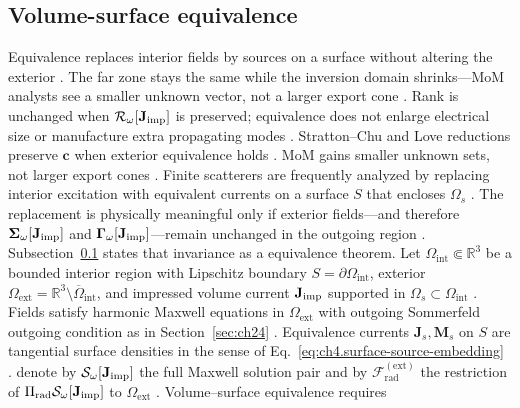 \subsection{Volume-surface equivalence}
\label{sec:ch421}
Equivalence replaces interior fields by sources on a surface without altering the exterior \cite{stratton1941}. The far zone stays the same while the inversion domain shrinks---MoM analysts see a smaller unknown vector, not a larger export cone \cite{harrington2001}. Rank is unchanged when $\mathcal{R}_\omega[\mathbf{J}_{\mathrm{imp}}]$ is preserved; equivalence does not enlarge electrical size or manufacture extra propagating modes \cite{maxwell1873}.
Stratton--Chu and Love reductions preserve $\mathbf{c}$ when exterior equivalence holds \cite{stratton1941}. MoM gains smaller unknown sets, not larger export cones \cite{devaney2004}.
\medskip
Finite scatterers are frequently analyzed by replacing interior excitation with equivalent currents on a
surface \(S\) that encloses \(\Omega_{s}\) \cite{stratton1941}. The replacement is physically
meaningful only if exterior fields---and therefore \(\boldsymbol{\Sigma}_\omega[\mathbf{J}_{\mathrm{imp}}]\) and
\(\boldsymbol{\Gamma}_\omega[\mathbf{J}_{\mathrm{imp}}]\)---remain unchanged in the outgoing region
\cite{collin2001}. Subsection~\ref{sec:ch421} states that invariance as a equivalence theorem.
Let \(\Omega_{\mathrm{int}}\Subset\mathbb{R}^{3}\) be a bounded interior region with Lipschitz boundary
\(S=\partial\Omega_{\mathrm{int}}\), exterior \(\Omega_{\mathrm{ext}}=\mathbb{R}^{3}\setminus\overline{\Omega}_{\mathrm{int}}\),
and impressed volume current \(\mathbf{J}_{\mathrm{imp}}\) supported in \(\Omega_{s}\subset\Omega_{\mathrm{int}}\)
\cite{stratton1941}. Fields satisfy harmonic Maxwell equations in \(\Omega_{\mathrm{ext}}\) with outgoing
Sommerfeld outgoing condition as in Section~\ref{sec:ch24} \cite{stratton1941}. Equivalence currents
\(\mathbf{J}_{s},\mathbf{M}_{s}\) on \(S\) are tangential surface densities in the sense of
Eq.~\eqref{eq:ch4.surface-source-embedding} \cite{stratton1941}.
denote by \(\mathcal{S}_\omega[\mathbf{J}_{\mathrm{imp}}]\) the full Maxwell solution pair and by
\(\mathcal{F}^{\mathrm{(ext)}}_{\mathrm{rad}}\) the restriction of \(\Pi_{\mathrm{rad}}\mathcal{S}_\omega[\mathbf{J}_{\mathrm{imp}}]\) to
\(\Omega_{\mathrm{ext}}\) \cite{stratton1941}. Volume--surface equivalence requires
